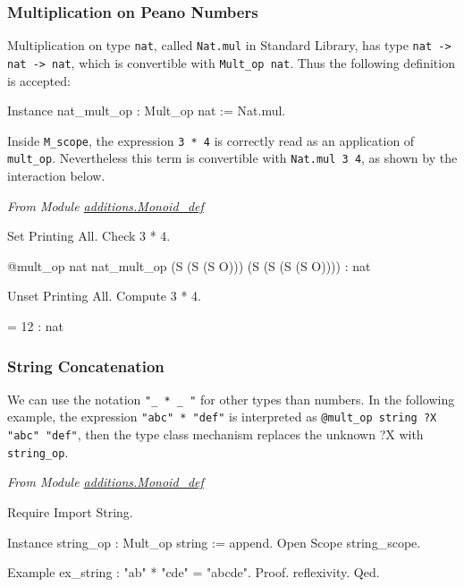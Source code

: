 \subsubsection{Multiplication on Peano Numbers}

Multiplication  on type \texttt{nat}, called \texttt{Nat.mul} in
Standard Library, has  type \linebreak \texttt{nat -> nat -> nat}, which is
convertible  with \texttt{Mult\_op nat}. Thus the following definition is
accepted:

\begin{Coqsrc}
Instance nat_mult_op : Mult_op nat  := Nat.mul.
\end{Coqsrc}

Inside \texttt{M\_scope}, the expression \texttt{3 * 4} is 
correctly read as an application of \texttt{mult\_op}. Nevertheless 
this term is convertible with \texttt{Nat.mul 3 4}, as shown by the 
interaction below.

\emph{From Module \href{../theories/html/hydras.additions.Monoid_def.html}{additions.Monoid\_def}}

\begin{Coqsrc}
Set Printing All.
Check  3 * 4. 
\end{Coqsrc}
\begin{Coqanswer}
@mult_op nat nat_mult_op (S (S (S O))) (S (S (S (S O))))
     : nat  
\end{Coqanswer}
\begin{Coqsrc}
Unset Printing All.
Compute 3 * 4.   
\end{Coqsrc}
\begin{Coqanswer}
 = 12  : nat  
\end{Coqanswer}

\subsubsection{String Concatenation}
We can use the notation \texttt{"\_ * \_ "} for other types than numbers.
In the following example,  the expression \texttt{"abc" * "def"} is interpreted
as \linebreak \texttt{@mult\_op string  {\color{darkred}?X} "abc"  "def"}, then the type  class mechanism replaces the unknown  {\color{darkred}?X} with 
\texttt{string\_op}.


\emph{From Module \href{../theories/html/hydras.additions.Monoid_def.html}{additions.Monoid\_def}}

\begin{Coqsrc}
Require Import String.

Instance string_op : Mult_op string := append.
Open Scope string_scope.

Example ex_string : "ab" * "cde" = "abcde".
Proof. reflexivity. Qed.
\end{Coqsrc}


